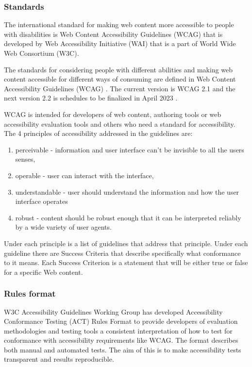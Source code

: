 \documentclass{master_thesis}
\begin{document}
\subsubsection{Standards}

The international standard for making web content more accessible to people with disabilities is Web Content Accessibility Guidelines (WCAG) that is developed by Web Accessibility Initiative (WAI) that is a part of World Wide Web Consortium (W3C).

The standards for considering people with different abilities and making web content accessible for different ways of consuming are defined in Web Content Accessibility Guidelines (WCAG) \citep{Kirkpatrick2018}. The current version is WCAG 2.1 and the next version 2.2 is schedules to be finalized in April 2023 \citep{Henry2023}.

WCAG is intended for developers of web content, authoring tools or web accessibility evaluation tools and others who need a standard for accessibility. The 4 principles of accessibility addressed in the guidelines are:
\begin{enumerate}
	\item perceivable - information and user interface can't be invisible to all the users senses,
	\item operable - user can interact with the interface,
	\item understandable - user should understand the information and how the user interface operates
	\item robust - content should be robust enough that it can be interpreted reliably by a wide variety of user agents.
\end{enumerate}
Under each principle is a list of guidelines that address that principle. Under each guideline there are Success Criteria that describe specifically what conformance to it means. Each Success Criterion is a statement that will be either true or false for a specific Web content.\citep{AGWGP2022}

\subsubsection{Rules format}

W3C Accessibility Guidelines Working Group has developed Accessibility Conformance Testing (ACT) Rules Format to provide developers of evaluation methodologies and testing tools a consistent interpretation of how to test for conformance with accessibility requirements like WCAG. The format describes both manual and automated tests. The aim of this is to make accessibility tests transparent and results reproducible. \citep{Fiers2019}
\end{document}
